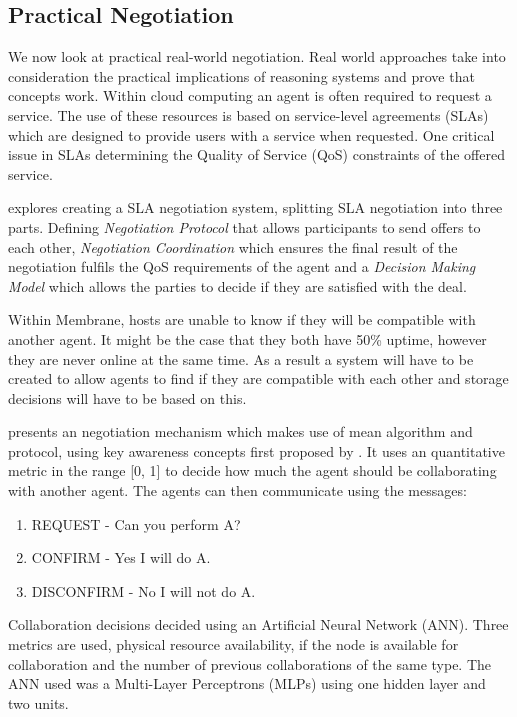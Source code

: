 \documentclass[11pt, a4paper, twocolumn, twoside]{report}
\begin{document}
\subsection{Practical Negotiation}

We now look at practical real-world negotiation. Real world approaches take into consideration the practical implications of reasoning systems and prove that concepts work. Within cloud computing an agent is often required to request a service. The use of these resources is based on service-level agreements (SLAs) which are designed to provide users with a service when requested. \citep{paletta2009mas} One critical issue in SLAs determining the  Quality of Service (QoS) constraints of the offered service.

\cite{yan2007autonomous} explores creating a SLA negotiation system, splitting SLA negotiation into three parts. Defining \emph{Negotiation Protocol} that allows participants to send offers to each other, \emph{Negotiation Coordination} which ensures the final result of the negotiation fulfils the QoS requirements of the agent and a \emph{Decision Making Model} which allows the parties to decide if they are satisfied with the deal.

Within Membrane, hosts are unable to know if they will be compatible with another agent. It might be the case that they both have 50\% uptime, however they are never online at the same time. As a result a system will have to be created to allow agents to find if they are compatible with each other and storage decisions will have to be based on this.

\cite{paletta2009mas} presents an negotiation mechanism which makes use of mean algorithm and protocol, using key awareness concepts first proposed by \cite{herrero2007agents}. It uses an quantitative metric in the range [0, 1] to decide how much the agent should be collaborating with another agent. The agents can then communicate using the messages:

\begin{enumerate}
 \item REQUEST - Can you perform A?
 \item CONFIRM - Yes I will do A.
 \item DISCONFIRM - No I will not do A.
\end{enumerate}

Collaboration decisions decided using an Artificial Neural Network (ANN). Three metrics are used, physical resource availability, if the node is available for collaboration and the number of previous collaborations of the same type. The ANN used was a Multi-Layer Perceptrons (MLPs) using one hidden layer and two units.
\end{document}

